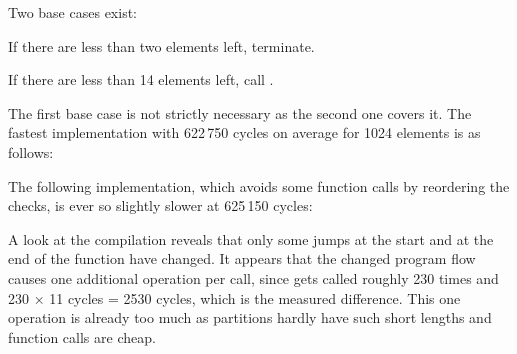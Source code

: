 Two base cases exist:
\begin{enumerate*}
	\item
	If there are less than two elements left, terminate.

	\item
	If there are less than 14 elements left, call \IS{}.
\end{enumerate*}
The first base case is not strictly necessary as the second one covers it.
The fastest implementation with 622\,750 cycles on average for 1024 elements is as follows:
The following implementation, which avoids some function calls by reordering the checks, is ever so slightly slower at 625\,150 cycles:
A look at the compilation reveals that only some jumps at the start and at the end of the function have changed.
It appears that the changed program flow causes one additional operation per call, since \QS{} gets called roughly 230 times and 230 × 11 cycles = 2530 cycles, which is the measured difference.
This one operation is already too much as partitions hardly have such short lengths and function calls are cheap.


